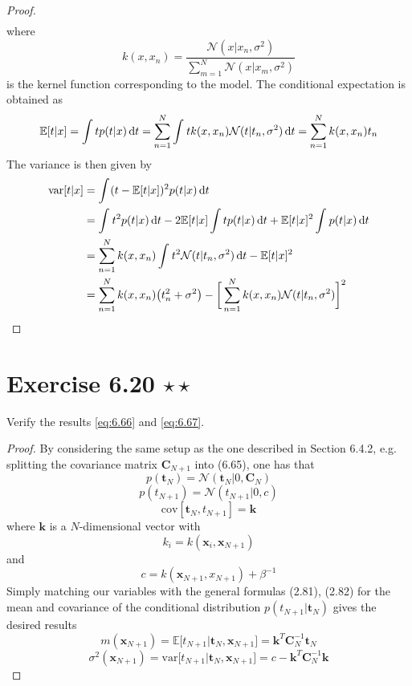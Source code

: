 \begin{proof}
\begin{align*}
\end{align*}
where 
\[
    k(x, x_n) = \frac{\mathcal{N}(x | x_n, \sigma^2)}
    {\displaystyle \sum_{m=1}^{N} \mathcal{N}(x | x_m, \sigma^2)}
\] 
is the kernel function corresponding to the model.
The conditional expectation is obtained as
\[
    \mathbb{E}[t | x] 
    = \int t p(t | x) \mathop{}\!\mathrm{d} t
    = \sum_{n=1}^{N} \int_{}^{} t k(x, x_n) \mathcal{N}(t | t_n, \sigma^2) \mathop{}\!\mathrm{d} t
    = \sum_{n=1}^{N} k(x, x_n) t_n
\] 
The variance is then given by
\begin{align*}
    \text{var}[t | x]
    &= \int_{}^{} (t - \mathbb{E}[t | x])^2 p(t | x) \mathop{}\!\mathrm{d} t \\
    &= \int_{}^{} t^2 p(t | x) \mathop{}\!\mathrm{d} t
    - 2\mathbb{E}[t | x] \int t p(t | x) \mathop{}\!\mathrm{d} t + \mathbb{E}[t | x]^2 \int_{}^{} p(t | x) \mathop{}\!\mathrm{d} t \\
    &= \sum_{n=1}^{N} k(x, x_n) \int_{}^{} t^2 \mathcal{N}(t | t_n, \sigma^2) \mathop{}\!\mathrm{d} t
    - \mathbb{E}[t | x]^2 \\
    &= \sum_{n=1}^{N} k(x, x_n) \big(t_n^2 + \sigma^2\big) 
    - \bigg[\sum_{n=1}^{N} k(x, x_n)\mathcal{N}(t | t_n, \sigma^2)\bigg]^2
\end{align*}
\end{proof}

\section*{Exercise 6.20 $\star \star$}
Verify the results \eqref{eq:6.66} and \eqref{eq:6.67}.

\vspace{1em}

\begin{proof}
    By considering the same setup as the one described in Section 6.4.2,
    e.g. splitting the covariance matrix $\mathbf{C}_{N + 1}$ into (6.65),
    one has that
    \[
        p(\mathbf{t}_N) = \mathcal{N}(\mathbf{t}_N | 0, \mathbf{C}_N)
    \] 
    \[
        p(t_{N + 1}) = \mathcal{N}(t_{N + 1} | 0, c)
    \] 
    \[
        \text{cov}[\mathbf{t}_N, t_{N + 1}] = \mathbf{k}
    \] 
    where $\mathbf{k}$ is a $N$-dimensional vector with
    \[
        k_i = k(\mathbf{x}_i, \mathbf{x}_{N + 1})
    \] 
    and
    \[
        c = k(\mathbf{x}_{N + 1}, x_{N + 1}) + \beta^{-1}
    \]
    Simply matching our variables with the general formulas
    (2.81), (2.82) for the mean and covariance of the conditional distribution
    $p(t_{N + 1} | \mathbf{t}_N)$ gives the desired results
    \begin{equation}
        m(\mathbf{x}_{N + 1}) = \mathbb{E}\big[t_{N + 1} | \mathbf{t}_N, \mathbf{x}_{N + 1}\big]
        = \mathbf{k}^T \mathbf{C}_N^{-1}\mathbf{t}_N
        \tag{6.66}\label{eq:6.66}
    \end{equation}
    \begin{equation}
        \sigma^2(\mathbf{x}_{N + 1}) 
        = \text{var}\big[t_{N + 1} | \mathbf{t}_N, \mathbf{x}_{N + 1}\big]
        = c - \mathbf{k}^T\mathbf{C}_N^{-1}\mathbf{k}
        \tag{6.67}\label{eq:6.67}
    \end{equation}
\end{proof}

